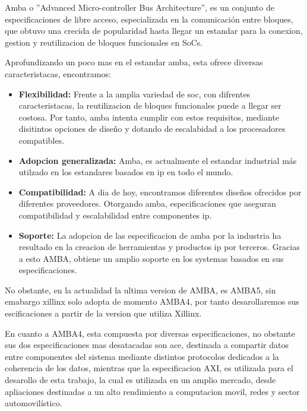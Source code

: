 \documentclass[11pt,spanish,listoffigures,listoftables]{tfgetsinf}
\begin{document}
   Amba o ''Advanced Micro-controller Bus Architecture'', es un conjunto de 
   especificaciones de libre acceso, especializada en la comunicación entre
   bloques, que obtuvo una crecida de popularidad hasta llegar un estandar
   para la conexion, gestion y reutilizacion de bloques funcionales en SoCs.

   Aprofundizando un poco mas en el estandar amba, esta ofrece diversas
   caracteristacas, encontramos:

   \begin{itemize}
      \item \textbf{Flexibilidad: } Frente a la amplia variedad de soc, con
      difrentes caracteristacas, la reutilizacion de bloques funcionales
      puede a llegar ser costosa.  Por tanto, amba intenta cumplir con estos
      requisitos, mediante disitintos opciones de diseño y  dotando de
      escalabidad a los procesadores compatibles. 
      \item \textbf{Adopcion generalizada: } Amba, es actualmente el estandar
      industrial  más utilzado en los estandares basados en ip en todo el
      mundo.
      \item \textbf{Compatibilidad: } A dia de hoy, encontramos diferentes
      diseños ofrecidos por diferentes proveedores. Otorgando amba,
      especificaciones que aseguran compatibilidad y escalabilidad entre
      componentes ip.
      \item \textbf{Soporte: } La adopcion de las especificacion de amba por
      la industria ha resultado en la creacion de herramientas y productos ip
      por terceros. Gracias a esto AMBA, obtiene un amplio soporte en los
      systemas basados en sus especificaciones.
   \end{itemize}

   No obstante, en la actualidad la ultima version de AMBA, es AMBA5, sin
   emabargo xillinx solo adopta de momento AMBA4, por tanto desarollaremos
   sus escificaciones a partir de la version que utiliza Xillinx.
   
   En cuanto a AMBA4, esta compuesta por diversas especificaciones, no
   obstante sus dos especificaciones mas desatacadas son ace, destinada a 
   compartir datos entre componentes del sistema mediante distintos
   protocolos dedicados a la coherencia de los datos, mientras que la
   especificacion AXI, es utilizada para el desarollo de esta trabajo, la
   cual es utilizada en un amplio mercado, desde apliaciones destinadas a un
   alto rendimiento a computacion movil, redes y sector automovilístico.
\end{document}
